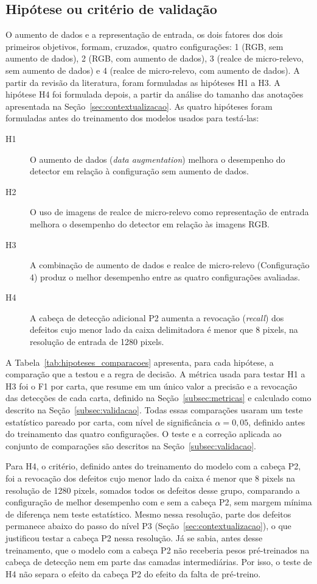 \documentclass[
    12pt,                %
    openright,           %
    oneside,             %
    a4paper,             %
    english,             %
    brazil               %
]{abntex2}
\begin{document}
\subsection{Hipótese ou critério de validação}
\label{subsec:hipotese}

O aumento de dados e a representação de entrada, os dois fatores dos
dois primeiros objetivos, formam, cruzados, quatro configurações: 1
(RGB, sem aumento de dados), 2 (RGB, com aumento de dados), 3 (realce de
micro-relevo, sem aumento de dados) e 4 (realce de micro-relevo, com
aumento de dados). A partir da revisão da literatura, foram formuladas as hipóteses H1 a
H3. A hipótese H4 foi formulada depois, a partir da análise do tamanho
das anotações apresentada na Seção~\ref{sec:contextualizacao}. As
quatro hipóteses foram formuladas antes do treinamento dos modelos
usados para testá-las:

\begin{description}
    \item[H1] O aumento de dados (\textit{data augmentation}) melhora o desempenho do detector em relação à configuração sem aumento de dados.
    \item[H2] O uso de imagens de realce de micro-relevo como representação de entrada melhora o desempenho do detector em relação às imagens RGB.
    \item[H3] A combinação de aumento de dados e realce de micro-relevo (Configuração 4) produz o melhor desempenho entre as quatro configurações avaliadas.
    \item[H4] A cabeça de detecção adicional P2 aumenta a revocação (\textit{recall}) dos defeitos cujo menor lado da caixa delimitadora é menor que 8 pixels, na resolução de entrada de 1280 pixels.
\end{description}

A Tabela~\ref{tab:hipoteses_comparacoes} apresenta, para cada hipótese,
a comparação que a testou e a regra de decisão. A métrica usada para
testar H1 a H3 foi o F1 por carta, que resume em
um único valor a precisão e a revocação das detecções de cada carta,
definido na Seção~\ref{subsec:metricas} e calculado como descrito na
Seção~\ref{subsec:validacao}. Todas essas comparações
usaram um teste estatístico pareado por carta, com nível de
significância $\alpha = 0{,}05$, definido antes do treinamento das
quatro configurações. O teste e a correção aplicada ao conjunto de
comparações são descritos na Seção~\ref{subsec:validacao}.

Para H4, o critério, definido antes do treinamento do modelo com a
cabeça P2, foi a revocação dos defeitos cujo menor lado da caixa é
menor que 8 pixels na resolução de 1280 pixels, somados todos os
defeitos desse grupo, comparando a configuração de melhor desempenho
com e sem a cabeça P2, sem margem mínima de diferença nem teste
estatístico. Mesmo nessa resolução, parte dos defeitos
permanece abaixo do passo do nível P3 (Seção~\ref{sec:contextualizacao}),
o que justificou testar a cabeça P2 nessa resolução. Já se sabia, antes desse
treinamento, que o modelo com a cabeça P2 não receberia pesos
pré-treinados na cabeça de detecção nem em parte das camadas
intermediárias. Por isso, o teste de H4 não separa o efeito da cabeça
P2 do efeito da falta de pré-treino.
\end{document}
